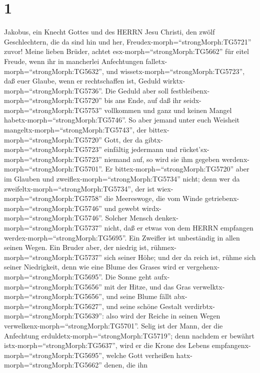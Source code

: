 \hypertarget{section}{%
\section{1}\label{section}}

 Jakobus, ein Knecht Gottes und des HERRN Jesu Christi, den
zwölf Geschlechtern, die da sind hin und her,
Freudex-morph=``strongMorph:TG5721'' zuvor!  Meine lieben
Brüder, achtet esx-morph=``strongMorph:TG5662'' für eitel Freude, wenn
ihr in mancherlei Anfechtungen falletx-morph=``strongMorph:TG5632'',
 und wissetx-morph=``strongMorph:TG5723'', daß euer Glaube,
wenn er rechtschaffen ist, Geduld wirktx-morph=``strongMorph:TG5736''.
 Die Geduld aber soll
festbleibenx-morph=``strongMorph:TG5720'' bis ans Ende, auf daß ihr
seidx-morph=``strongMorph:TG5753'' vollkommen und ganz und keinen Mangel
habetx-morph=``strongMorph:TG5746''.  So aber jemand unter
euch Weisheit mangeltx-morph=``strongMorph:TG5743'', der
bittex-morph=``strongMorph:TG5720'' Gott, der da
gibtx-morph=``strongMorph:TG5723'' einfältig jedermann und
rücket'sx-morph=``strongMorph:TG5723'' niemand auf, so wird sie ihm
gegeben werdenx-morph=``strongMorph:TG5701''.  Er
bittex-morph=``strongMorph:TG5720'' aber im Glauben und
zweiflex-morph=``strongMorph:TG5734'' nicht; denn wer da
zweifeltx-morph=``strongMorph:TG5734'', der ist
wiex-morph=``strongMorph:TG5758'' die Meereswoge, die vom Winde
getriebenx-morph=``strongMorph:TG5746'' und gewebt
wirdx-morph=``strongMorph:TG5746''.  Solcher Mensch
denkex-morph=``strongMorph:TG5737'' nicht, daß er etwas von dem HERRN
empfangen werdex-morph=``strongMorph:TG5695''.  Ein Zweifler
ist unbeständig in allen seinen Wegen.  Ein Bruder aber, der
niedrig ist, rühmex-morph=``strongMorph:TG5737'' sich seiner Höhe;
 und der da reich ist, rühme sich seiner Niedrigkeit, denn
wie eine Blume des Grases wird er
vergehenx-morph=``strongMorph:TG5695''.  Die Sonne geht
aufx-morph=``strongMorph:TG5656'' mit der Hitze, und das Gras
verwelktx-morph=``strongMorph:TG5656'', und seine Blume fällt
abx-morph=``strongMorph:TG5627'', und seine schöne Gestalt
verdirbtx-morph=``strongMorph:TG5639'': also wird der Reiche in seinen
Wegen verwelkenx-morph=``strongMorph:TG5701''.  Selig ist
der Mann, der die Anfechtung erduldetx-morph=``strongMorph:TG5719'';
denn nachdem er bewährt istx-morph=``strongMorph:TG5637'', wird er die
Krone des Lebens empfangenx-morph=``strongMorph:TG5695'', welche Gott
verheißen hatx-morph=``strongMorph:TG5662'' denen, die ihn

